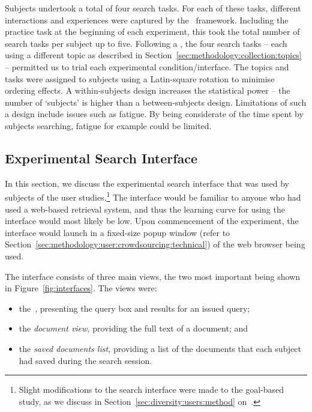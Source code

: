 Subjects undertook a total of four search tasks. For each of these tasks, different interactions and experiences were captured by the \treconomics~framework. Including the practice task at the beginning of each experiment, this took the total number of search tasks per subject up to five. Following a , the four search tasks -- each using a different topic as described in Section~\ref{sec:methodology:collection:topics} -- permitted us to trial each experimental condition/interface. The topics and tasks were assigned to subjects using a Latin-square rotation to minimise ordering effects. A within-subjects design increases the statistical power -- the number of `subjects' is higher than a between-subjects design. Limitations of such a design include issues such as fatigue. By being considerate of the time spent by subjects searching, fatigue for example could be limited.

\subsection{Experimental Search Interface}\label{sec:methodology:user:interface}
In this section, we discuss the experimental search interface that was used by subjects of the user studies.\footnote{Slight modifications to the search interface were made to the goal-based study, as we discuss in Section~\ref{sec:diversity:users:method} on~\pageref{sec:diversity:users:method}.} The interface would be familiar to anyone who had used a web-based retrieval system, and thus the learning curve for using the interface would most likely be low. Upon commencement of the experiment, the interface would launch in a fixed-size popup window (refer to Section~\ref{sec:methodology:user:crowdsourcing:technical}) of the web browser being used.

The interface consists of three main views, the two most important being shown in Figure~\ref{fig:interfaces}. The views were:

\begin{itemize}
    \item{the~, presenting the query box and results for an issued query;}
    \item{the \emph{document view,} providing the full text of a document; and}
    \item{the \emph{saved documents list,} providing a list of the documents that each subject had saved during the search session.}
\end{itemize}

